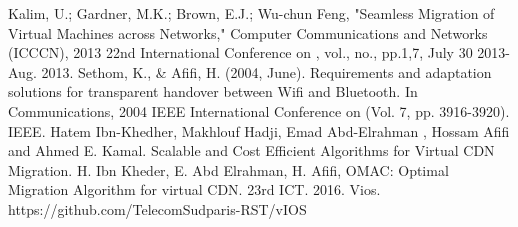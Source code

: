 \documentclass[letterpaper,conference]{IEEEtran}
\begin{document}
\begin{thebibliography}{1}
\bibitem[17]{[17]} Kalim, U.; Gardner, M.K.; Brown, E.J.; Wu-chun Feng, "Seamless Migration of Virtual Machines across Networks," Computer Communications and Networks (ICCCN), 2013 22nd International Conference on , vol., no., pp.1,7, July 30 2013-Aug. 2013.
\bibitem[18]{[18]} Sethom, K., \& Afifi, H. (2004, June). Requirements and adaptation solutions for transparent handover between Wifi and Bluetooth. In Communications, 2004 IEEE International Conference on (Vol. 7, pp. 3916-3920). IEEE.
\bibitem[19]{[19]} Hatem Ibn-Khedher, Makhlouf Hadji, Emad Abd-Elrahman , Hossam Afifi and Ahmed E. Kamal. Scalable and Cost Efficient Algorithms for Virtual CDN Migration.
\bibitem[20]{[20]} H. Ibn Kheder, E. Abd Elrahman, H. Afifi, OMAC: Optimal Migration Algorithm for virtual CDN. 23rd ICT. 2016.
\bibitem[21]{[21]} Vios. https://github.com/TelecomSudparis-RST/vIOS

\end{thebibliography}
\end{document}
